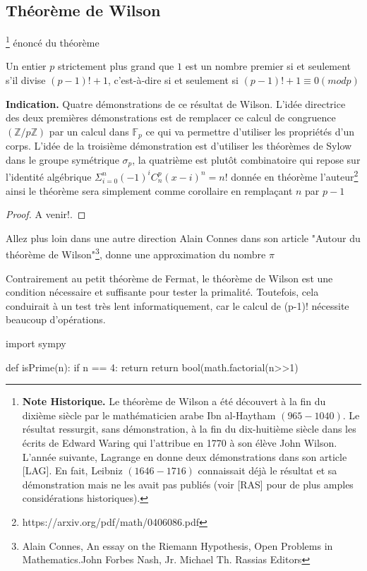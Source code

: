 \subsection{Théorème de Wilson}\footnote{\textbf{Note Historique.} Le théorème de Wilson a été découvert à la fin du dixième siècle par le mathématicien arabe Ibn al-Haytham $(965-1040)$. Le résultat ressurgit, sans démonstration, à la fin du dix-huitième siècle dans les écrits de Edward Waring qui l’attribue en 1770 à son élève John Wilson. L’année suivante, Lagrange en donne deux démonstrations dans son article [LAG]. En fait, Leibniz $(1646-1716)$ connaissait déjà le résultat et sa démonstration mais ne les avait pas publiés (voir [RAS] pour de plus amples considérations historiques).}
\'enoncé du théorème 
\begin{theorem}
 Un entier $p$ strictement plus grand que $1$ est un nombre premier si et seulement s'il divise $(p - 1)! + 1$, c'est-à-dire si et seulement si $(p-1)!+ 1 \equiv 0 (mod p)$
\end{theorem}
\textbf{Indication.}  Quatre démonstrations de ce résultat de Wilson. L'idée directrice des deux premières démonstrations est de remplacer ce calcul de congruence $(\mathbb{Z}/p\mathbb{Z})$ par un calcul dans $\mathbb{F}_{p}$ ce qui va permettre d'utiliser les propriétés d’un corps. L'idée de la troisième démonstration est d’utiliser les théorèmes de Sylow dans le groupe symétrique $\mathbb{\sigma}_{p}$, la quatrième est plutôt combinatoire qui repose sur l'identité algébrique $\Sigma_{i=0}^{n} (-1)^{i} C_n^{p}(x-i)^n = n!$ donnée en théorème l'auteur\footnote{https://arxiv.org/pdf/math/0406086.pdf} ainsi le théorème sera simplement comme
corollaire en remplaçant $n$ par $p-1$
\begin{proof}
A venir!.
\end{proof}
Allez plus loin dans une autre direction Alain Connes dans son article "Autour du théorème de Wilson"\footnote{Alain Connes, An essay on the Riemann Hypothesis, Open Problems in Mathematics.John Forbes Nash, Jr. Michael Th. Rassias Editors}, donne une approximation du nombre $\pi$
\begin{remark}
Contrairement au petit théorème de Fermat, le théorème de Wilson est une condition nécessaire et suffisante pour tester la primalité. Toutefois, cela conduirait à un test très lent informatiquement, car le calcul de (p-1)! nécessite beaucoup d'opérations.
\end{remark}
\begin{python}
import sympy

def isPrime(n):
 if n == 4: return 
 return bool(math.factorial(n>>1)%
\end{python}
